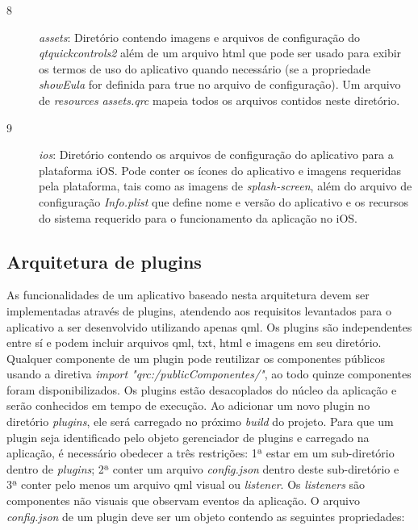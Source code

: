 \begin{description}
	\item[8] \textit{assets}: Diretório contendo imagens e arquivos de configuração do \textit{qtquickcontrols2} além de um arquivo html que pode ser usado para exibir os termos de uso do aplicativo quando necessário (se a propriedade \textit{showEula} for definida para true no arquivo de configuração). Um arquivo de \textit{resources} \textit{assets.qrc} mapeia todos os arquivos contidos neste diretório.

	\item[9] \textit{ios}: Diretório contendo os arquivos de configuração do aplicativo para a plataforma iOS. Pode conter os ícones do aplicativo e imagens requeridas pela plataforma, tais como as imagens de \textit{splash-screen}, além do arquivo de configuração \textit{Info.plist} que define nome e versão do aplicativo e os recursos do sistema requerido para o funcionamento da aplicação no iOS.
\end{description}


\subsection{Arquitetura de plugins}
As funcionalidades de um aplicativo baseado nesta arquitetura devem ser implementadas através de plugins, atendendo aos requisitos levantados para o aplicativo a ser desenvolvido utilizando apenas qml. Os plugins são independentes entre sí e podem incluir arquivos qml, txt, html e imagens em seu diretório. Qualquer componente de um plugin pode reutilizar os componentes públicos usando a diretiva \textit{import "qrc:/publicComponentes/"}, ao todo quinze componentes foram disponibilizados. Os plugins estão desacoplados do núcleo da aplicação e serão conhecidos em tempo de execução. Ao adicionar um novo plugin no diretório \textit{plugins}, ele será carregado no próximo \textit{build} do projeto. Para que um plugin seja identificado pelo objeto gerenciador de plugins e carregado na aplicação, é necessário obedecer a três restrições: 1ª estar em um sub-diretório dentro de \textit{plugins}; 2ª conter um arquivo \textit{config.json} dentro deste sub-diretório e 3ª conter pelo menos um arquivo qml visual ou \textit{listener}. Os \textit{listeners} são componentes não visuais que observam eventos da aplicação. O arquivo \textit{config.json} de um plugin deve ser um objeto contendo as seguintes propriedades:

